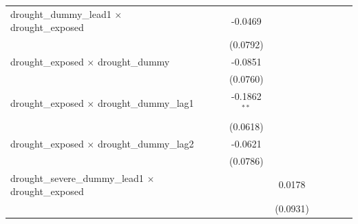 \begin{tabular}{lcccccccc}
   drought\_dummy\_lead1 $\times$ drought\_exposed                    &                       &                       & -0.0469               &                       &                       &                       &                       &   \\   
                                                                      &                       &                       & (0.0792)              &                       &                       &                       &                       &   \\   
   drought\_exposed $\times$ drought\_dummy                           &                       &                       & -0.0851               &                       &                       &                       &                       &   \\   
                                                                      &                       &                       & (0.0760)              &                       &                       &                       &                       &   \\   
   drought\_exposed $\times$ drought\_dummy\_lag1                     &                       &                       & -0.1862$^{**}$        &                       &                       &                       &                       &   \\   
                                                                      &                       &                       & (0.0618)              &                       &                       &                       &                       &   \\   
   drought\_exposed $\times$ drought\_dummy\_lag2                     &                       &                       & -0.0621               &                       &                       &                       &                       &   \\   
                                                                      &                       &                       & (0.0786)              &                       &                       &                       &                       &   \\   
   drought\_severe\_dummy\_lead1 $\times$ drought\_exposed            &                       &                       &                       & 0.0178                &                       &                       &                       &   \\   
                                                                      &                       &                       &                       & (0.0931)              &                       &                       &                       &   \\   

\end{tabular}
